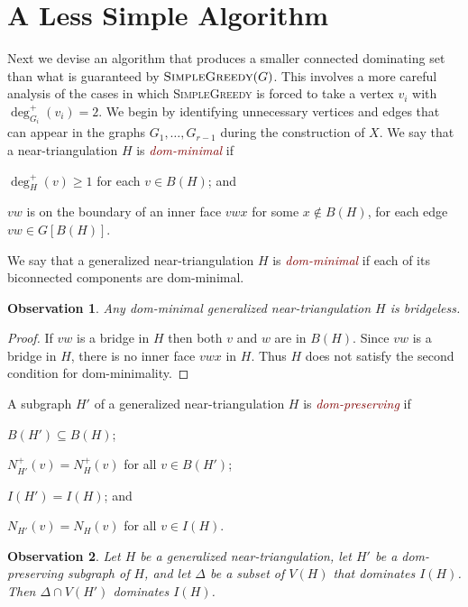 \documentclass[12pt]{article}
\newtheorem{obs}{Observation}
\newcommand{\defin}[1]{\emph{\textcolor{Maroon}{#1}}}
\begin{document}
\section{A Less Simple Algorithm}

Next we devise an algorithm that produces a smaller connected dominating set than what is guaranteed by $\textsc{SimpleGreedy}(G)$.  This involves a more careful analysis of the cases in which \textsc{SimpleGreedy} is forced to take a vertex $v_i$ with $\deg^+_{G_i}(v_i)=2$.  We begin by identifying unnecessary vertices and edges that can appear in the graphs $G_1,\ldots,G_{r-1}$ during the construction of $X$.   We say that a near-triangulation $H$ is \defin{dom-minimal} if
\begin{compactenum}[({DM}1)]
    \item $\deg^+_H(v)\ge 1$ for each $v\in B(H)$; and \label{bad_vertex}
    \item $vw$ is on the boundary of an inner face $vwx$ for some $x\not\in B(H)$, for each edge $vw\in G[B(H)]$. \label{bad_edge}
\end{compactenum}
We say that a generalized near-triangulation $H$ is \defin{dom-minimal} if each of its biconnected components are dom-minimal.

\begin{obs}
    Any dom-minimal generalized near-triangulation $H$ is bridgeless.
\end{obs}

\begin{proof}
   If $vw$ is a bridge in $H$ then both $v$ and $w$ are in $B(H)$.  Since $vw$ is a bridge in $H$, there is no inner face $vwx$ in $H$. Thus $H$ does not satisfy the second condition for dom-minimality.
\end{proof}

A subgraph $H'$ of a generalized near-triangulation $H$ is \defin{dom-preserving} if
\begin{compactenum}[({DP}1)]
  \item $B(H')\subseteq B(H)$;
  \item $N^+_{H'}(v)=N^+_H(v)$ for all $v\in B(H')$;
  \item $I(H')=I(H)$; and
  \item $N_{H'}(v)=N_H(v)$ for all $v\in I(H)$.
\end{compactenum}

\begin{obs}
  Let $H$ be a generalized near-triangulation, let $H'$ be a dom-preserving subgraph of $H$, and let $\Delta$ be a subset of $V(H)$ that dominates $I(H)$.  Then $\Delta\cap V(H')$ dominates $I(H)$.
\end{obs}
\end{document}
